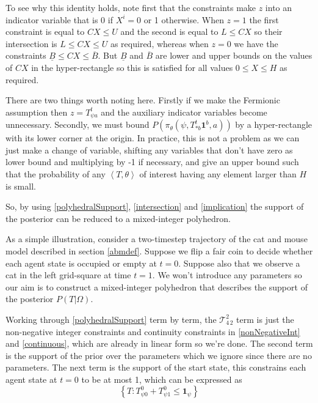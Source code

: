 \documentclass{article}
\begin{document}
To see why this identity holds, note first that the constraints make $z$ into an indicator variable that is 0 if $X^i=0$ or 1 otherwise. When $z=1$ the first constraint is equal to $CX \le U$ and the second is equal to $L \le CX$ so their intersection is $L \le  CX \le U$ as required, whereas when $z=0$ we have the constraints $\underline{B} \le CX \le \overline{B}$. But $\underline{B}$ and $\overline{B}$ are lower and upper bounds on the values of $CX$ in the hyper-rectangle so this is satisfied for all values $0 \le X \le H$ as required. 

There are two things worth noting here. Firstly if we make the Fermionic assumption then $z = T^t_{\psi a}$ and the auxiliary indicator variables become unnecessary. Secondly, we must bound $P(\pi_\theta(\psi,T^t_{*b}\mathbf{1}^b,a))$ by a hyper-rectangle with its lower corner at the origin. In practice, this is not a problem as we can just make a change of variable, shifting any variables that don't have zero as lower bound and multiplying by -1 if necessary, and give an upper bound such that the probability of any $\left<T,\theta\right>$ of interest having any element larger than $H$ is small.

So, by using \eqref{polyhedralSupport}, \eqref{intersection} and \eqref{implication} the support of the posterior can be reduced to a mixed-integer polyhedron.

As a simple illustration, consider a two-timestep trajectory of the cat and mouse model described in section \ref{abmdef}. Suppose we flip a fair coin to decide whether each agent state is occupied or empty at $t=0$. Suppose also that we observe a cat in the left grid-square at time $t=1$. We won't introduce any parameters so our aim is to construct a mixed-integer polyhedron that describes the support of the posterior $P(T|\Omega)$.

Working through \eqref{polyhedralSupport} term by term, the $\mathcal{T}^2_{4\,2}$ term is just the non-negative integer constraints and continuity constraints in \eqref{nonNegativeInt} and \eqref{continuous}, which are already in linear form so we're done. The second term is the support of the prior over the parameters which we ignore since there are no parameters. The next term is the support of the start state, this constrains each agent state at $t=0$ to be at most 1, which can be expressed as
\[
\left\{T:T^0_{\psi 0} + T^0_{\psi 1} \le \mathbf{1}_{\psi}\right\}
\]
\end{document}
